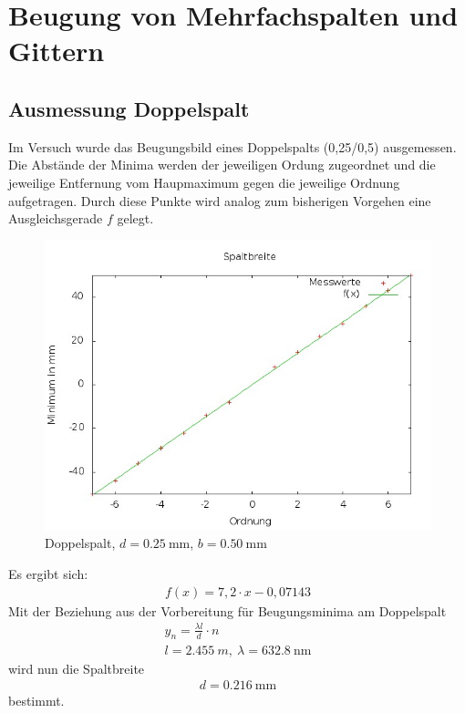 \documentclass[ngerman, parskip*]{scrartcl}
\begin{document}


\section{Beugung von Mehrfachspalten und Gittern}
\subsection{Ausmessung Doppelspalt}
Im Versuch wurde das Beugungsbild eines Doppelspalts (0,25/0,5) ausgemessen. Die Abstände der Minima werden der jeweiligen Ordung zugeordnet und die jeweilige Entfernung vom Haupmaximum gegen die jeweilige Ordnung aufgetragen. Durch diese Punkte wird analog zum bisherigen Vorgehen eine Ausgleichsgerade $f$ gelegt.
\begin{figure}
\centering
    
          \centering
          \includegraphics[width=\textwidth,natwidth=2560,natheight=1920]{Diagramme/doppel2.jpg}
          \caption{Doppelspalt, $d = \SI{0,25}{\mm}$, $b = \SI{0,50}{\milli\m}$}
\end{figure}

Es ergibt sich:
\begin{align*}
f(x)=7,2\cdot x-0,07143
\end{align*}
Mit der Beziehung aus der Vorbereitung für Beugungsminima am Doppelspalt
\begin{align*}
  y_n=\frac{\lambda l}{d}\cdot n\\
  l=\SI{2,455}{m},\ \lambda=\SI{632,8}{\nano\m}
\end{align*}
wird nun die Spaltbreite 
\begin{align*}
  d=\SI{0,216}{\milli\m}
\end{align*}
bestimmt.
\end{document}
